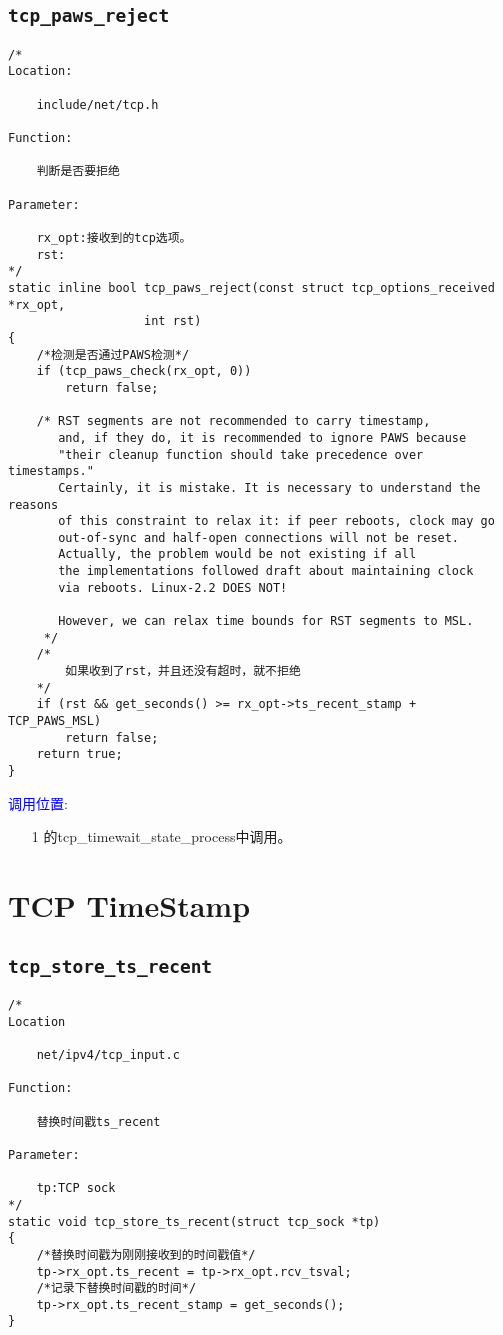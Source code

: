     \subsection{\texttt{tcp_paws_reject}}
        \label{TCPPAWS:tcp_paws_reject}
\begin{verbatim}
/*
Location:

    include/net/tcp.h

Function:

    判断是否要拒绝

Parameter:
    
    rx_opt:接收到的tcp选项。
    rst:
*/
static inline bool tcp_paws_reject(const struct tcp_options_received *rx_opt,
                   int rst)
{
    /*检测是否通过PAWS检测*/
    if (tcp_paws_check(rx_opt, 0))
        return false;

    /* RST segments are not recommended to carry timestamp,
       and, if they do, it is recommended to ignore PAWS because
       "their cleanup function should take precedence over timestamps."
       Certainly, it is mistake. It is necessary to understand the reasons
       of this constraint to relax it: if peer reboots, clock may go
       out-of-sync and half-open connections will not be reset.
       Actually, the problem would be not existing if all
       the implementations followed draft about maintaining clock
       via reboots. Linux-2.2 DOES NOT!

       However, we can relax time bounds for RST segments to MSL.
     */
    /*
        如果收到了rst，并且还没有超时，就不拒绝
    */
    if (rst && get_seconds() >= rx_opt->ts_recent_stamp + TCP_PAWS_MSL)
        return false;
    return true;
}
\end{verbatim}

        \textcolor{blue}{调用位置}:
            \begin{enumerate}
                \item[1]        \label{ClientReceiveFIN:tcp_timewait_state_process}的tcp\_timewait\_state\_process中调用。
            \end{enumerate}
        
\section{TCP TimeStamp}
    \subsection{\texttt{tcp_store_ts_recent}}
\begin{verbatim}
/*
Location

    net/ipv4/tcp_input.c

Function:

    替换时间戳ts_recent

Parameter:

    tp:TCP sock
*/
static void tcp_store_ts_recent(struct tcp_sock *tp)
{
    /*替换时间戳为刚刚接收到的时间戳值*/
    tp->rx_opt.ts_recent = tp->rx_opt.rcv_tsval;
    /*记录下替换时间戳的时间*/
    tp->rx_opt.ts_recent_stamp = get_seconds();
}
\end{verbatim}
